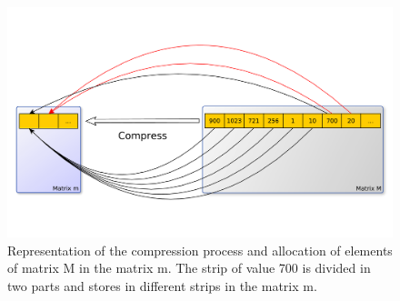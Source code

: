 \documentclass[10pt]{article}
\begin{document}
\begin{figure}[htp]
  \includegraphics[scale=0.3,clip]{fig01.pdf}
  \caption{Representation of the compression process and allocation of 
elements of matrix M in the matrix m. The strip of value 700 is divided in two 
parts and stores in different strips in the matrix m.}
  \label{fig:01}
\end{figure}





\end{document}
